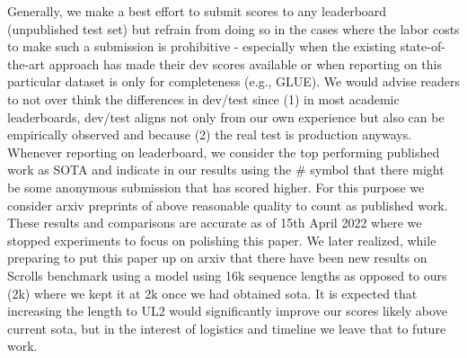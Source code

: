 \documentclass[10pt]{article}
\begin{document}
Generally, we make a best effort to submit scores to any leaderboard (unpublished test set) but refrain from doing so in the cases where the labor costs to make such a submission is prohibitive - especially when the existing state-of-the-art approach has made their dev scores available or when reporting on this particular dataset is only for completeness (e.g., GLUE). We would advise readers to not over think the differences in dev/test since (1) in most academic leaderboards, dev/test aligns not only from our own experience but also can be empirically observed and because (2) the real test is production anyways. Whenever reporting on leaderboard, we consider the top performing published work as SOTA and indicate in our results using the $\#$ symbol that there might be some anonymous submission that has scored higher. For this purpose we consider arxiv preprints of above reasonable quality to count as published work. These results and comparisons are accurate as of 15th April 2022 where we stopped experiments to focus on polishing this paper. We later realized, while preparing to put this paper up on arxiv that there have been new results on Scrolls benchmark using a model \citep{guo2021longt5} using 16k sequence lengths as opposed to ours (2k) where we kept it at 2k once we had obtained sota. It is expected that increasing the length to UL2 would significantly improve our scores likely above current sota, but in the interest of logistics and timeline we leave that to future work. 
\end{document}
